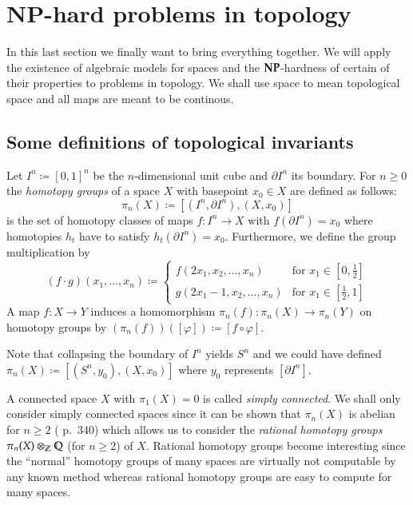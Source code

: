 \section{NP-hard problems in topology}

In this last section we finally want to bring everything together. We will apply the existence of algebraic
models for spaces and the $\mathbf{NP}$-hardness of certain of their properties to problems in topology.
We shall use space to mean topological space and all maps are meant to be continous.

\subsection{Some definitions of topological invariants}
\label{sec:DefinitionsOfTopologicalInvariants}

\begin{Definition}
 Let $I^n \coloneqq [0,1]^n$ be the $n$-dimensional unit cube and $\partial I^n$ its boundary.
 For $n \geq 0$ the \emph{homotopy groups} of a space $X$ with basepoint $x_0 \in X$ are defined as follows: \newline
 $$\pi_n(X) \coloneqq [(I^n, \partial I^n), (X,x_0) ]$$
 is the set of homotopy classes of maps
 $f \colon I^n \to X$ with $f(\partial I^n) = x_0$ where homotopies $h_t$ have to satisfy $h_t(\partial I^n) = x_0$.
 Furthermore, we define the group multiplication by 
 $$ (f \cdot g) (x_1, \ldots, x_n) \coloneqq 
 \begin{cases}
  f(2x_1, x_2, \ldots, x_n) &\text{for $x_1 \in [0, \frac{1}{2}]$} \\
 
  g(2x_1 - 1, x_2, \ldots, x_n) &\text{for $x_1 \in [ \frac{1}{2}, 1]$}
 \end{cases}
$$
A map $f \colon X \to Y$ induces a homomorphism $\pi_n(f) \colon \pi_n(X) \to \pi_n(Y)$
on homotopy groups by 
$(\pi_n(f)) ([\varphi]) \coloneqq [f \circ \varphi]$.
\end{Definition}

Note that collapsing the boundary of $I^n$ yields $S^n$ and we could have defined 
$\pi_n(X) \coloneqq [ (S^n, y_0), (X,x_0)]$ where $y_0$ represents $[\partial I^n]$.

\begin{Remark}
 A connected space $X$ with $\pi_1(X) = 0$ is called \emph{simply connected}. We shall only consider
 simply connected spaces since it can be shown that $\pi_n (X)$ is abelian for $n \geq 2$ 
 (\cite{SWB-334616069} p.\ 340)
 which allows us to consider the \emph{rational homotopy groups}
 $ \pi_n(X) \otimes_{\mathbb{Z}} \mathbb{Q}$ (for $n \geq 2$) of $X$. Rational homotopy groups become interesting since the ``normal''
 homotopy groups of many spaces are virtually not computable by any known method whereas rational homotopy groups
 are easy to compute for many spaces.
\end{Remark}

